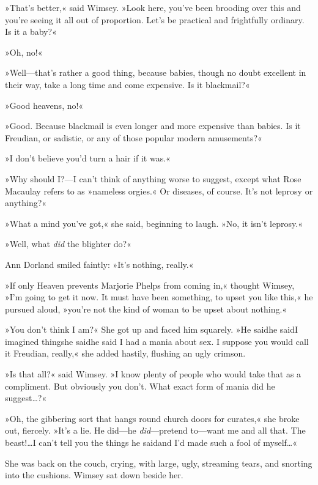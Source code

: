 »That's better,« said Wimsey. »Look here, you've been brooding over this and you're seeing it all out of proportion. Let's be practical and frightfully ordinary. Is it a baby?«

»Oh, no!«

»Well—that's rather a good thing, because babies, though no doubt excellent in their way, take a long time and come expensive. Is it blackmail?«

»Good heavens, no!«

»Good. Because blackmail is even longer and more expensive than babies. Is it Freudian, or sadistic, or any of those popular modern amusements?«

»I don't believe you'd turn a hair if it was.«

»Why should I\@?—I can't think of anything worse to suggest, except what Rose Macaulay refers to as »nameless orgies.« Or diseases, of course. It's not leprosy or anything?«

»What a mind you've got,« she said, beginning to laugh. »No, it isn't leprosy.«

»Well, what \textit{did} the blighter do?«

Ann Dorland smiled faintly: »It's nothing, really.«

»If only Heaven prevents Marjorie Phelps from coming in,« thought Wimsey, »I'm going to get it now\textellipsis. It must have been something, to upset you like this,« he pursued aloud, »you're not the kind of woman to be upset about nothing.«

»You don't think I am?« She got up and faced him squarely. »He said\textellipsis  he said\textellipsis  I imagined things\textellipsis  he said\textellipsis  he said I had a mania about sex. I suppose you would call it Freudian, really,« she added hastily, flushing an ugly crimson.

»Is that all?« said Wimsey. »I know plenty of people who would take that as a compliment\textellipsis. But obviously you don't. What exact form of mania did he suggest\dots?«

»Oh, the gibbering sort that hangs round church doors for curates,« she broke out, fiercely. »It's a lie. He did—he \textit{did}—pretend to—want me and all that. The beast!\dots I can't tell you the things he said\textellipsis  and I'd made such a fool of myself\dots«

She was back on the couch, crying, with large, ugly, streaming tears, and snorting into the cushions. Wimsey sat down beside her.

